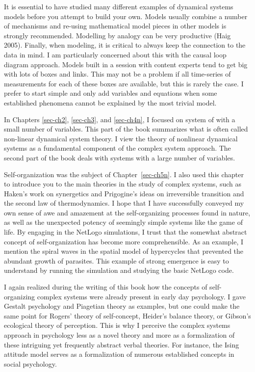 \documentclass[
  a4paper,
  DIV=11,
  numbers=noendperiod]{scrreprt}
\begin{document}
It is essential to have studied many different examples of dynamical
systems models before you attempt to build your own. Models usually
combine a number of mechanisms and re-using mathematical model pieces in
other models is strongly recommended. Modelling by analogy can be very
productive (Haig 2005). Finally, when modeling, it is critical to always
keep the connection to the data in mind. I am particularly concerned
about this with the causal loop diagram approach. Models built in a
session with content experts tend to get big with lots of boxes and
links. This may not be a problem if all time-series of measurements for
each of these boxes are available, but this is rarely the case. I prefer
to start simple and only add variables and equations when some
established phenomena cannot be explained by the most trivial model.

In Chapters \ref{sec-ch2}, \ref{sec-ch3}, and \ref{sec-ch4n}, I focused
on system of with a small number of variables. This part of the book
summarizes what is often called non-linear dynamical system theory. I
view the theory of nonlinear dynamical systems as a fundamental
component of the complex system approach. The second part of the book
deals with systems with a large number of variables.

Self-organization was the subject of Chapter~\ref{sec-ch5n}. I also used
this chapter to introduce you to the main theories in the study of
complex systems, such as Haken's work on synergetics and Prigogine's
ideas on irreversible transition and the second law of thermodynamics. I
hope that I have successfully conveyed my own sense of awe and amazement
at the self-organizing processes found in nature, as well as the
unexpected potency of seemingly simple systems like the game of life. By
engaging in the NetLogo simulations, I trust that the somewhat abstract
concept of self-organization has become more comprehensible. As an
example, I mention the spiral waves in the spatial model of hypercycles
that prevented the abundant growth of parasites. This example of strong
emergence is easy to understand by running the simulation and studying
the basic NetLogo code.

I again realized during the writing of this book how the concepts of
self-organizing complex systems were already present in early day
psychology. I gave Gestalt psychology and Piagetian theory as examples,
but one could make the same point for Rogers' theory of self-concept,
Heider's balance theory, or Gibson's ecological theory of perception.
This is why I perceive the complex systems approach in psychology less
as a novel theory and more as a formalization of these intriguing yet
frequently abstract verbal theories. For instance, the Ising attitude
model serves as a formalization of numerous established concepts in
social psychology.
\end{document}
